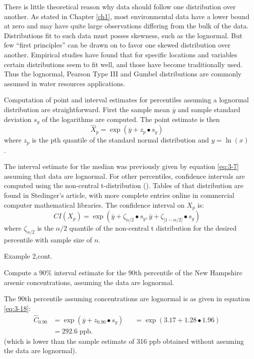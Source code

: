 \documentclass[]{book}
\begin{document}
There is little theoretical reason why data should follow one distribution over another. As stated in Chapter \ref{ch1}, most environmental data have a lower bound at zero and may have quite large observations differing from the bulk of the data. Distributions fit to such data must posses skewness, such as the lognormal. But few ``first principles'' can be drawn on to favor one skewed distribution over another. Empirical studies have found that for specific locations and variables certain distributions seem to fit well, and those have become traditionally used. Thus the lognormal, Pearson Type III and Gumbel distributions are commonly assumed in water resources applications.

Computation of point and interval estimates for percentiles assuming a lognormal distribution are straightforward. First the sample mean \(\overline{y}\) and sample standard deviation \(s_{y}\) of the logarithms are computed. The point estimate is then
\begin{equation}
\hat{X}_{p} = \exp{\left( \overline{y} + z_{p} \bullet s_{y} \right)}
\label{eq:3-18}
\end{equation}
where \(z_{p}\) is the pth quantile of the standard normal distribution and \(y = \ln{(x)}\).

The interval estimate for the median was previously given by equation \eqref{eq:3-7} assuming that data are lognormal. For other percentiles, confidence intervals are computed using the non-central t-distribution (\citet{stedinger_confidence_1983}). Tables of that distribution are found in Stedinger's article, with more complete entries online in commercial computer mathematical libraries. The confidence interval on \(X_{p}\) is:
\begin{equation}
CI \left({X}_{p} \right) = \exp{\left( \overline{y} + \zeta_{\alpha / 2} \bullet s_{y}, \overline{y} + \zeta_{\lbrack 1 - \alpha / 2 \rbrack} \bullet s_{y}\right)}
\label{eq:3-19}
\end{equation}
where \(\zeta_{\alpha / 2}\) is the \(\alpha / 2\) quantile of the non-central t distribution for the desired percentile with sample size of \(n\).

Example 2,cont.

Compute a 90\% interval estimate for the 90th percentile of the New Hampshire arsenic concentrations, assuming the data are lognormal.

The 90th percentile assuming concentrations are lognormal is as given in equation \eqref{eq:3-18}:
\begin{equation}
\begin{aligned}
\hat{C}_{0.90} &= \exp{\left( \overline{y} + z_{0.90} \bullet s_{y} \right)} &&= \exp{(3.17 + 1.28 \bullet 1.96)} \\
&= 292.6 \; \text{ppb.}
\end{aligned}
\end{equation}
(which is lower than the sample estimate of 316 ppb obtained without assuming the data are lognormal).
\end{document}
